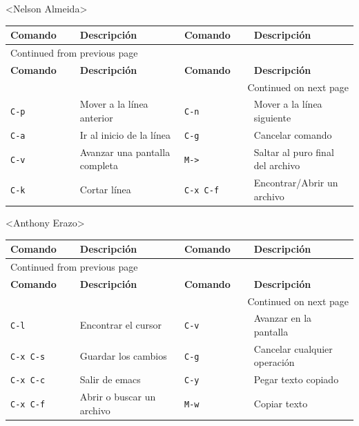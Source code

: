 \documentclass{article}
\begin{document}
<Nelson Almeida>
\begin{longtable}{|p{0.2\linewidth}|p{0.3\linewidth}|p{0.2\linewidth}|p{0.3\linewidth}|}
\textbf{Comando} & \textbf{Descripción} & \textbf{Comando} & \textbf{Descripción}\\[0pt]
\hline
\endfirsthead
\multicolumn{4}{l}{Continued from previous page} \\[0pt]
\hline

\textbf{Comando} & \textbf{Descripción} & \textbf{Comando} & \textbf{Descripción} \\[0pt]

\hline
\endhead
\hline\multicolumn{4}{r}{Continued on next page} \\
\endfoot
\endlastfoot
\hline
\texttt{C-p} & Mover a la línea anterior & \texttt{C-n} & Mover a la línea siguiente\\[0pt]
\texttt{C-a} & Ir al inicio de la línea & \texttt{C-g} & Cancelar comando\\[0pt]
\texttt{C-v} & Avanzar una pantalla completa & \texttt{M->} & Saltar al puro final del archivo\\[0pt]
\texttt{C-k} & Cortar línea & \texttt{C-x C-f} & Encontrar/Abrir un archivo\\[0pt]
\end{longtable}

<Anthony Erazo>
\begin{longtable}{|p{0.2\linewidth}|p{0.3\linewidth}|p{0.2\linewidth}|p{0.3\linewidth}|}
\textbf{Comando} & \textbf{Descripción} & \textbf{Comando} & \textbf{Descripción}\\[0pt]
\hline
\endfirsthead
\multicolumn{4}{l}{Continued from previous page} \\[0pt]
\hline

\textbf{Comando} & \textbf{Descripción} & \textbf{Comando} & \textbf{Descripción} \\[0pt]

\hline
\endhead
\hline\multicolumn{4}{r}{Continued on next page} \\
\endfoot
\endlastfoot
\hline
\texttt{C-l} & Encontrar el cursor & \texttt{C-v} & Avanzar en la pantalla\\[0pt]
\texttt{C-x C-s} & Guardar los cambios & \texttt{C-g} & Cancelar cualquier operación\\[0pt]
\texttt{C-x C-c} & Salir de emacs & \texttt{C-y} & Pegar texto copiado\\[0pt]
\texttt{C-x C-f} & Abrir o buscar un archivo & \texttt{M-w} & Copiar texto\\[0pt]
\end{longtable}
\end{document}
